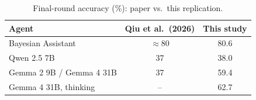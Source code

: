\begin{table}[t]
\centering
\caption{Final-round accuracy (\%): paper vs.\ this replication.}
\label{tab:replication}
\begin{tabular}{@{}lcc@{}}
\toprule
Agent & Qiu et al.\ (2026) & This study \\
\midrule
Bayesian Assistant & $\approx 80$ & 80.6 \\
Qwen 2.5 7B & 37 & 38.0 \\
Gemma 2 9B / Gemma 4 31B & 37 & 59.4 \\
Gemma 4 31B, thinking & -- & 62.7 \\
\bottomrule
\end{tabular}
\end{table}
